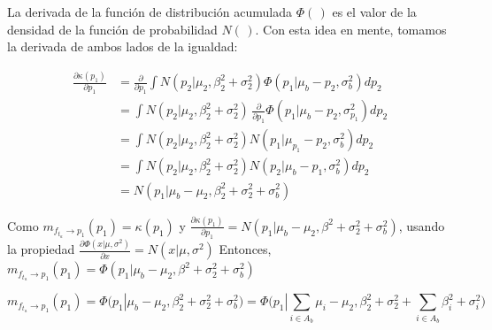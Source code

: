\documentclass[11pt,twoside, spanish]{report} %
\begin{document}
La derivada de la funci\'on de distribuci\'on acumulada $\Phi(\,)$ es el valor de la densidad de la funci\'on de probabilidad $N(\,)$. Con esta idea en mente, tomamos la derivada de ambos lados de la igualdad:

\begin{equation}\label{eq:ta-p_derivada}
	\begin{split}
		\frac{\partial\kappa(p_1)}{\partial p_1} &= \frac{\partial}{\partial p_1} \int  N(p_2| \mu_{2}, \beta_2^2 + \sigma_{2}^2 )    \Phi (p_1 | \mu_b -p_2 ,  \sigma_{b}^2 )  dp_2 \\
		&= \int  N(p_2| \mu_2,\beta_2^2 + \sigma_2^2 ) \, \frac{\partial}{\partial p_1} \Phi (p_1| \mu_{b} - p_2, \sigma_{p_1}^2 )   dp_2   \\
		&= \int  N(p_2| \mu_{2}, \beta_2^2 +\sigma_{2}^2 )  N(p_1| \mu_{p_1} -p_2 , \sigma_b^2)   dp_2  \\
		& = \int  N(p_2| \mu_{2}, \beta_2^2 +\sigma_2^2 )  N(p_2| \mu_{b}  -p_1 , \sigma_b^2)   dp_2  \\
		&= N(p_1| \mu_{b} - \mu_{2}, \beta_2^2+\sigma_2^2 + \sigma_{b}^2)
	\end{split}
\end{equation}

Como $m_{f_{t_a} \rightarrow p_1}(p_1) = \kappa(p_1)$ y $\frac{\partial\kappa(p_1)}{\partial p_1}=  N(p_1| \mu_{b} - \mu_{2}, \beta^2+\sigma_2^2 + \sigma_{b}^2)$, usando la propiedad $\frac{\partial\Phi(x| \mu, \sigma^2)}{\partial x}=N(x| \mu, \sigma^2)$ Entonces, $m_{f_{t_a} \rightarrow p_1}(p_1) = \Phi(p_1| \mu_b - \mu_2, \beta^2 + \sigma_2^2 + \sigma_b^2)$

\begin{equation}
	m_{f_{t_a} \rightarrow p_1}(p_1) =  \Phi(p_1| \mu_b - \mu_2, \beta_2^2 + \sigma_2^2 + \sigma_b^2) =  \Phi\Big(p_1| \sum_{i \in A_b} \mu_i - \mu_2, \beta_2^2 + \sigma_2^2 + \sum_{i \in A_b} \beta_i^2 + \sigma_i^2 \Big)
\end{equation}
\end{document}
